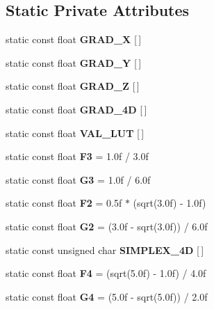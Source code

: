 \subsection*{Static Private Attributes}
\begin{DoxyCompactItemize}
\item 
static const float {\bfseries G\+R\+A\+D\+\_\+X} \mbox{[}$\,$\mbox{]}
\item 
static const float {\bfseries G\+R\+A\+D\+\_\+Y} \mbox{[}$\,$\mbox{]}
\item 
static const float {\bfseries G\+R\+A\+D\+\_\+Z} \mbox{[}$\,$\mbox{]}
\item 
static const float {\bfseries G\+R\+A\+D\+\_\+4D} \mbox{[}$\,$\mbox{]}
\item 
static const float {\bfseries V\+A\+L\+\_\+\+L\+UT} \mbox{[}$\,$\mbox{]}
\item 
\mbox{\label{classnoisefast_a1e19bfd2e3c7c26d35096b35d00ec862}} 
static const float {\bfseries F3} = 1.\+0f / 3.\+0f
\item 
\mbox{\label{classnoisefast_a62c2e8a320cfdb50d0012672acac288b}} 
static const float {\bfseries G3} = 1.\+0f / 6.\+0f
\item 
\mbox{\label{classnoisefast_ae90fff6986f84607664f36d8037c35c3}} 
static const float {\bfseries F2} = 0.\+5f $\ast$ (sqrt(3.\+0f) -\/ 1.\+0f)
\item 
\mbox{\label{classnoisefast_afd92d3ecdd480674705b28120b782422}} 
static const float {\bfseries G2} = (3.\+0f -\/ sqrt(3.\+0f)) / 6.\+0f
\item 
static const unsigned char {\bfseries S\+I\+M\+P\+L\+E\+X\+\_\+4D} \mbox{[}$\,$\mbox{]}
\item 
\mbox{\label{classnoisefast_aa8731e3f91c2afbaeb209f8fedc48673}} 
static const float {\bfseries F4} = (sqrt(5.\+0f) -\/ 1.\+0f) / 4.\+0f
\item 
\mbox{\label{classnoisefast_a61dc4379b1116fc94705894e1d2255be}} 
static const float {\bfseries G4} = (5.\+0f -\/ sqrt(5.\+0f)) / 2.\+0f
\item 
\mbox{\label{classnoisefast_ac068535ebb4d1fc308cb930fada5fe18}} 

\end{DoxyCompactItemize}
